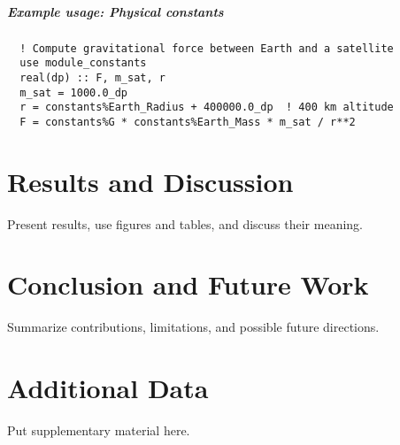 \documentclass[12pt,a4paper]{report}
\begin{document}
\paragraph{Example usage: Physical constants}
\begin{verbatim}
  ! Compute gravitational force between Earth and a satellite
  use module_constants
  real(dp) :: F, m_sat, r
  m_sat = 1000.0_dp
  r = constants%Earth_Radius + 400000.0_dp  ! 400 km altitude
  F = constants%G * constants%Earth_Mass * m_sat / r**2
\end{verbatim}


\chapter{Results and Discussion}
Present results, use figures and tables, and discuss their meaning.

\chapter{Conclusion and Future Work}
Summarize contributions, limitations, and possible future directions.

\appendix
\chapter{Additional Data}
Put supplementary material here.

\printbibliography
\end{document}
